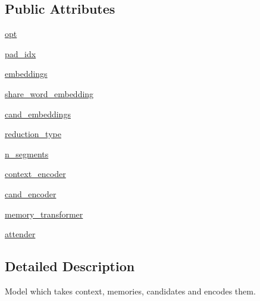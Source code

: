 \subsection*{Public Attributes}
\begin{DoxyCompactItemize}
\item 
\hyperlink{classparlai_1_1agents_1_1transformer_1_1modules_1_1TransformerMemNetModel_a293a7995da2bc66087db07ba4669fb35}{opt}
\item 
\hyperlink{classparlai_1_1agents_1_1transformer_1_1modules_1_1TransformerMemNetModel_ab70ecab55a92126804e165d745642142}{pad\+\_\+idx}
\item 
\hyperlink{classparlai_1_1agents_1_1transformer_1_1modules_1_1TransformerMemNetModel_aa776378904d1ffd3148e330036230713}{embeddings}
\item 
\hyperlink{classparlai_1_1agents_1_1transformer_1_1modules_1_1TransformerMemNetModel_a92d7385aa1b2603fa03ed2f5ad7f66be}{share\+\_\+word\+\_\+embedding}
\item 
\hyperlink{classparlai_1_1agents_1_1transformer_1_1modules_1_1TransformerMemNetModel_a6c12d979c4ce2a21f9a756e7ccc6e7e5}{cand\+\_\+embeddings}
\item 
\hyperlink{classparlai_1_1agents_1_1transformer_1_1modules_1_1TransformerMemNetModel_a3211cf5e4f390d5cf0f7598a7b789985}{reduction\+\_\+type}
\item 
\hyperlink{classparlai_1_1agents_1_1transformer_1_1modules_1_1TransformerMemNetModel_a9ac6c75642035a573f9ac123ee302403}{n\+\_\+segments}
\item 
\hyperlink{classparlai_1_1agents_1_1transformer_1_1modules_1_1TransformerMemNetModel_a899a125583f6fbf7f4809c2744162ac9}{context\+\_\+encoder}
\item 
\hyperlink{classparlai_1_1agents_1_1transformer_1_1modules_1_1TransformerMemNetModel_adf42f25f3ae4564f531835aeec39bb5f}{cand\+\_\+encoder}
\item 
\hyperlink{classparlai_1_1agents_1_1transformer_1_1modules_1_1TransformerMemNetModel_a6d1a5e20639c71de7a60e63b88238784}{memory\+\_\+transformer}
\item 
\hyperlink{classparlai_1_1agents_1_1transformer_1_1modules_1_1TransformerMemNetModel_a95c72e762694a7017243bfcf0b37a1e7}{attender}
\end{DoxyCompactItemize}


\subsection{Detailed Description}
\begin{DoxyVerb}Model which takes context, memories, candidates and encodes them.
\end{DoxyVerb}
 

